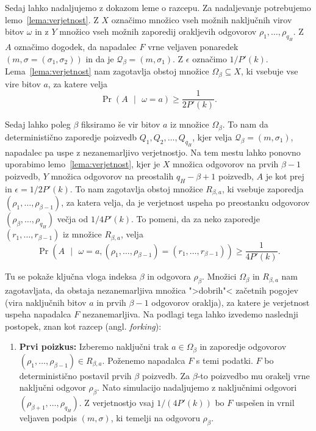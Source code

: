 \begin{dokaz}
    Sedaj lahko nadaljujemo z dokazom leme o razcepu. Za nadaljevanje potrebujemo lemo~\ref{lema:verjetnost}.
    Z $X$ označimo množico vseh možnih naključnih virov bitov $\omega$ in z $Y$ množico vseh
    možnih zaporedij orakljevih odgovorov $\rho_1, \dots, \rho_{q_H}$. Z $A$ označimo dogodek, da napadalec
    $F$ vrne veljaven ponaredek $(m, \sigma = (\sigma_1, \sigma_2))$ in da je $\mathcal{Q}_\beta =
    (m, \sigma_1)$. Z $\epsilon$ označimo $1/P'(k)$. Lema~\ref{lema:verjetnost} nam zagotavlja obstoj
    množice $\Omega_\beta \subseteq X$, ki vsebuje vse vire bitov $a$, za katere velja
    $$
    \Pr(A \text{ }|\text{ } \omega = a) \geq \frac{1}{2P'(k)}.
    $$

    Sedaj lahko poleg $\beta$ fiksiramo še vir bitov $a$ iz množice $\Omega_\beta$. To nam da
    deterministično zaporedje poizvedb $Q_1, Q_2, \dots, Q_{q_H}$, kjer velja $\mathcal{Q}_\beta =
    (m, \sigma_1)$, napadalec pa uspe z nezanemarljivo verjetnostjo. Na tem mestu lahko ponovno
    uporabimo lemo~\ref{lema:verjetnost}, kjer je $X$ množica odgovorov na prvih $\beta - 1$ poizvedb,
    $Y$ množica odgovorov na preostalih $q_H - \beta + 1$ poizvedb, $A$ je kot prej in $\epsilon = 1/2P'(k)$.
    To nam zagotavlja obstoj množice $R_{\beta, a}$, ki vsebuje zaporedja $(\rho_1, \dots,
    \rho_{\beta - 1})$, za katera velja, da je verjetnost uspeha po preostanku odgovorov $(\rho_\beta,
    \dots, \rho_{q_H})$ večja od $1/4P'(k)$. To pomeni, da za neko zaporedje $(r_1, \dots, r_{\beta - 1})$
    iz množice $R_{\beta, a}$, velja
    $$
    \Pr(A \text{ }|\text{ } \omega = a, (\rho_1, \dots, \rho_{\beta - 1}) = (r_1, \dots, r_{\beta - 1})) \geq \frac{1}{4P'(k)}.
    $$

    Tu se pokaže ključna vloga indeksa $\beta$ in odgovora $\rho_\beta$. Množici
    $\Omega_\beta$ in $R_{\beta,a}$ nam zagotavljata, da obstaja nezanemarljiva množica
    ">dobrih"< začetnih pogojev (vira naključnih bitov $a$ in prvih $\beta-1$ odgovorov oraklja),
    za katere je verjetnost uspeha napadalca $F$ nezanemarljiva. Na podlagi tega lahko izvedemo
    naslednji postopek, znan kot razcep (angl. \emph{forking}):

    \begin{enumerate}
        \item \textbf{Prvi poizkus:} Izberemo naključni trak $a \in \Omega_\beta$ in zaporedje
            odgovorov $(\rho_1, \dots, \rho_{\beta-1}) \in R_{\beta,a}$. Poženemo napadalca $F$
            s temi podatki. $F$ bo deterministično postavil prvih $\beta$ poizvedb. Za $\beta$-to
            poizvedbo mu orakelj vrne naključni odgovor $\rho_\beta$. Nato simulacijo nadaljujemo
            z naključnimi odgovori $(\rho_{\beta+1}, \dots, \rho_{q_H})$. Z verjetnostjo vsaj
            $1/(4P'(k))$ bo $F$ uspešen in vrnil veljaven podpis $(m, \sigma)$, ki temelji na
            odgovoru $\rho_\beta$.


\end{enumerate}
\end{dokaz}
